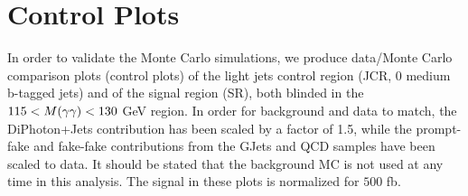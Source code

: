 \section{Control Plots}
\label{sec:control}

In order to validate the Monte Carlo simulations, we produce data/Monte Carlo comparison plots (control plots) of the light jets control region (JCR, 0 medium b-tagged jets) and of the signal region (SR), both blinded in the $115 < M(\gamma\gamma) < 130$ GeV region.  
In order for background and data to match, the DiPhoton+Jets contribution has been scaled by a factor of 1.5, while the prompt-fake and fake-fake contributions from the GJets and QCD samples have been scaled to data. 
It should be stated that the background MC is not used at any time in this analysis. 
The signal in these plots is normalized for $500$ fb.


